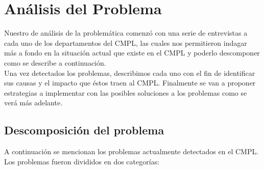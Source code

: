 \section{Análisis del Problema}
Nuestro de análisis de la problemática comenzó con una serie de entrevistas a cada uno de los departamentos del CMPL, las cuales nos permitieron indagar más a fondo en la situación actual que existe en el CMPL y poderlo descomponer como se describe a continuación.\\
	
Una vez detectados los problemas, describimos cada uno con el fin de identificar sus causas y el impacto que éstos traen al CMPL. Finalmente se van a proponer estrategias a implementar con las posibles soluciones a los problemas como se verá más adelante. 
	\subsection{Descomposición del problema}
	A continuación se mencionan los problemas actualmente detectados en el CMPL. Los problemas fueron divididos en dos categorías:\\
	
